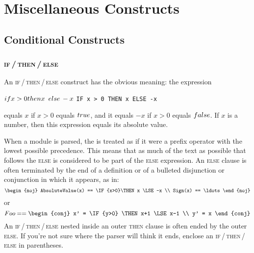 \documentclass[fleqn,leqno]{article}
\begin{document}


\newpage

\section{Miscellaneous Constructs}

\subsection{Conditional Constructs} 

\subsubsection{{\rm \textsc{if}\,/\,\textsc{then}\,/\,\textsc{else}}}

An 
\textsc{if}\,/\,\textsc{then}\,/\,\textsc{else} 
construct 
has the obvious meaning:  the expression
\begin{twocols}
$\IF{x>0}\THEN x \LSE -x$
\midcol
\verb|IF x > 0 THEN x ELSE -x|
\end{twocols}
equals 
$x$ if $x>0$ equals $\TRUE$, and it equals $-x$ if $x>0$ equals
$\FALSE$.  If $x$ is a number, then this expression equals its
absolute value.

When a module is parsed, the  is
treated as if it were a prefix operator with the lowest possible
precedence.  This means that as much of the text as possible that
follows the \textsc{else} is considered to be part of the
\textsc{else} expression.  An \textsc{else} clause is often terminated
by the end of a definition or of a bulleted disjunction or conjunction
in which it appears, as in:
 \[ \begin{noj}
    AbsoluteValue(x) == \IF{x>0}\THEN x \LSE -x \\
    Sign(x) == \ldots
    \end{noj}
 \]
or
 \[  Foo == \begin{conj}
            x' = \IF {y>0} \THEN x+1 \LSE x-1 \\
            y' = x
            \end{conj}
 \]
An \textsc{if}\,/\,\textsc{then}\,/\,\textsc{else} nested inside an
outer \textsc{then} clause is often ended by the outer \textsc{else}.
If you're not sure where the parser will think it ends, enclose an
\textsc{if}\,/\,\textsc{then}\,/\,\textsc{else} in parentheses.
\end{document}
